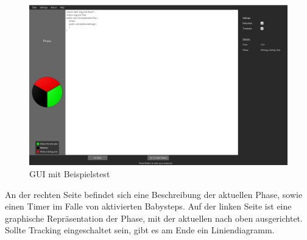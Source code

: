 \documentclass[12pt]{article}
\begin{document}
		\begin{figure} [htbp]
			\includegraphics[width=1\textwidth]{figures/guiArea}
			\caption{GUI mit Beispielstest}
			\label{guiArea}
		\end{figure}
		
		An der rechten Seite befindet sich eine Beschreibung der aktuellen Phase, sowie einen Timer im Falle von aktivierten Babysteps. Auf der linken Seite ist eine graphische Repräsentation der Phase, mit der aktuellen nach oben ausgerichtet.
		Sollte Tracking eingeschaltet sein, gibt es am Ende ein Liniendiagramm.
\end{document}
